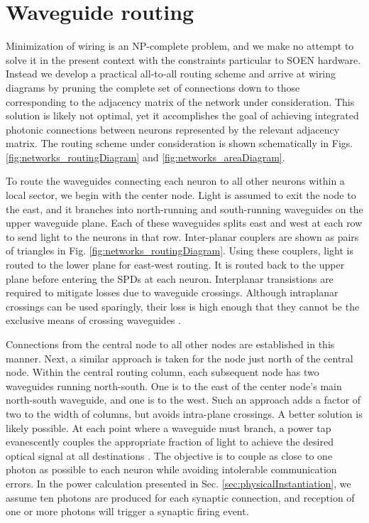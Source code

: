 \documentclass[twocolumn]{article}
\begin{document}
\section{\label{apx:sectorRouting}Waveguide routing}
Minimization of wiring is an NP-complete problem, and we make no attempt to solve it in the present context with the constraints particular to SOEN hardware. Instead we develop a practical all-to-all routing scheme and arrive at wiring diagrams by pruning the complete set of connections down to those corresponding to the adjacency matrix of the network under consideration. This solution is likely not optimal, yet it accomplishes the goal of achieving integrated photonic connections between neurons represented by the relevant adjacency matrix. The routing scheme under consideration is shown schematically in Figs.\,\ref{fig:networks_routingDiagram} and \ref{fig:networks_areaDiagram}.

To route the waveguides connecting each neuron to all other neurons within a local sector, we begin with the center node. Light is assumed to exit the node to the east, and it branches into north-running and south-running waveguides on the upper waveguide plane. Each of these waveguides splits east and west at each row to send light to the neurons in that row. Inter-planar couplers \cite{chbu2017} are shown as pairs of triangles in Fig. \ref{fig:networks_routingDiagram}. Using these couplers, light is routed to the lower plane for east-west routing. It is routed back to the upper plane before entering the SPDs at each neuron. Interplanar transistions are required to mitigate losses due to waveguide crossings. Although intraplanar crossings can be used sparingly, their loss is high enough that they cannot be the exclusive means of crossing waveguides \cite{lish2014}. 

Connections from the central node to all other nodes are established in this manner. Next, a similar approach is taken for the node just north of the central node. Within the central routing column, each subsequent node has two waveguides running north-south. One is to the east of the center node's main north-south waveguide, and one is to the west. Such an approach adds a factor of two to the width of columns, but avoids intra-plane crossings. A better solution is likely possible. At each point where a waveguide must branch, a power tap evanescently couples the appropriate fraction of light to achieve the desired optical signal at all destinations \cite{chbu2018}. The objective is to couple as close to one photon as possible to each neuron while avoiding intolerable communication errors. In the power calculation presented in Sec. \ref{sec:physicalInstantiation}, we assume ten photons are produced for each synaptic connection, and reception of one or more photons will trigger a synaptic firing event. 
\end{document}
